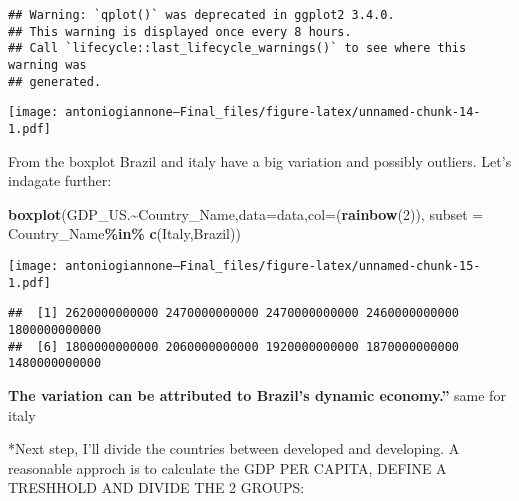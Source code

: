 \documentclass[
]{article}
\newenvironment{Shaded}{\begin{snugshade}}{\end{snugshade}}
\newcommand{\AttributeTok}[1]{\textcolor[rgb]{0.13,0.29,0.53}{#1}}
\newcommand{\DecValTok}[1]{\textcolor[rgb]{0.00,0.00,0.81}{#1}}
\newcommand{\FunctionTok}[1]{\textcolor[rgb]{0.13,0.29,0.53}{\textbf{#1}}}
\newcommand{\NormalTok}[1]{#1}
\newcommand{\SpecialCharTok}[1]{\textcolor[rgb]{0.81,0.36,0.00}{\textbf{#1}}}
\newcommand{\StringTok}[1]{\textcolor[rgb]{0.31,0.60,0.02}{#1}}
\begin{document}
\begin{verbatim}
## Warning: `qplot()` was deprecated in ggplot2 3.4.0.
## This warning is displayed once every 8 hours.
## Call `lifecycle::last_lifecycle_warnings()` to see where this warning was
## generated.
\end{verbatim}

\texttt{[image: antoniogiannone---Final\_files/figure-latex/unnamed-chunk-14-1.pdf]}

From the boxplot Brazil and italy have a big variation and possibly
outliers. Let's indagate further:

\begin{Shaded}
\begin{Highlighting}[]
\FunctionTok{boxplot}\NormalTok{(GDP\_US.}\SpecialCharTok{\textasciitilde{}}\NormalTok{Country\_Name,}\AttributeTok{data=}\NormalTok{data,}\AttributeTok{col=}\NormalTok{(}\FunctionTok{rainbow}\NormalTok{(}\DecValTok{2}\NormalTok{)),}
        \AttributeTok{subset =}\NormalTok{ Country\_Name}\SpecialCharTok{\%in\%} \FunctionTok{c}\NormalTok{(}\StringTok{\textquotesingle{}Italy\textquotesingle{}}\NormalTok{,}\StringTok{\textquotesingle{}Brazil\textquotesingle{}}\NormalTok{))}
\end{Highlighting}
\end{Shaded}

\texttt{[image: antoniogiannone---Final\_files/figure-latex/unnamed-chunk-15-1.pdf]}

\begin{Shaded}
\end{Shaded}

\begin{verbatim}
##  [1] 2620000000000 2470000000000 2470000000000 2460000000000 1800000000000
##  [6] 1800000000000 2060000000000 1920000000000 1870000000000 1480000000000
\end{verbatim}

\textbf{The variation can be attributed to Brazil's dynamic economy.''}
same for italy

*Next step, I'll divide the countries between developed and developing.
A reasonable approch is to calculate the GDP PER CAPITA, DEFINE A
TRESHHOLD AND DIVIDE THE 2 GROUPS:
\end{document}
